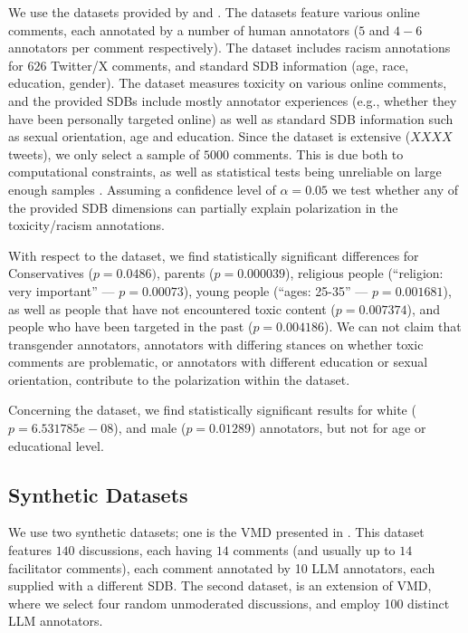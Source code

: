 \documentclass{article}
\begin{document}
We use the datasets provided by \textcite{kumar-et-al-2021} and \textcite{sap-etal-2022-annotators}. The datasets feature various online comments, each annotated by a number of human annotators ($5$ and $4-6$ annotators per comment respectively). The \textcite{sap-etal-2022-annotators} dataset includes racism annotations for $626$ Twitter/X comments, and standard \ac{SDB} information (age, race, education, gender). The \textcite{kumar-et-al-2021} dataset measures toxicity on various online comments, and the provided \acp{SDB} include mostly annotator experiences (e.g., whether they have been personally targeted online) as well as standard \ac{SDB} information such as sexual orientation, age and education. Since the dataset is extensive ($XXXX$ tweets), we only select a sample of $5000$ comments. This is due both to computational constraints, as well as statistical tests being unreliable on large enough samples \cite{trafimow2018manipulating}. Assuming a confidence level of $\alpha=0.05$ we test whether any of the provided \ac{SDB} dimensions can partially explain polarization in the toxicity/racism annotations. 

With respect to the \textcite{kumar-et-al-2021} dataset, we find statistically significant differences for Conservatives ($p=0.0486)$, parents ($p=0.000039$), religious people (``religion: very important'' --- $p = 0.00073$), young people (``ages: 25-35'' --- $p = 0.001681$), as well as people that have not encountered toxic content ($p=0.007374$), and people who have been targeted in the past ($p=0.004186$). We can not claim that transgender annotators, annotators with differing stances on whether toxic comments are problematic, or annotators with different education or sexual orientation, contribute to the polarization within the dataset.

Concerning the \textcite{sap-etal-2022-annotators} dataset, we find statistically significant results for white ($p = 6.531785e-08$), and male ($p=0.01289$) annotators, but not for age or educational level.


\subsection{Synthetic Datasets}

We use two synthetic datasets; one is the \ac{VMD} presented in \textcite{tsirmpas2025scalableevaluationonlinefacilitation}. This dataset features $140$ discussions, each having $14$ comments (and usually up to $14$ facilitator comments), each comment annotated by 10 \ac{LLM} annotators, each supplied with a different \ac{SDB}. The second dataset, is an extension of \ac{VMD}, where we select four random unmoderated discussions, and employ 100 distinct \ac{LLM} annotators.
\end{document}
